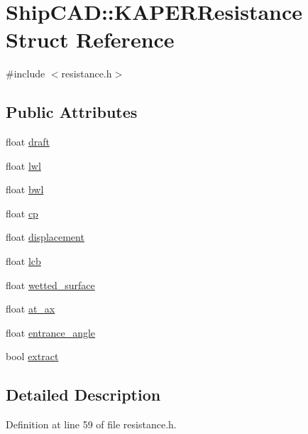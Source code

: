 \hypertarget{structShipCAD_1_1KAPERResistance}{\section{Ship\-C\-A\-D\-:\-:K\-A\-P\-E\-R\-Resistance Struct Reference}
\label{structShipCAD_1_1KAPERResistance}
}


{\ttfamily \#include $<$resistance.\-h$>$}

\subsection*{Public Attributes}
\begin{DoxyCompactItemize}
\item 
float \hyperlink{structShipCAD_1_1KAPERResistance_a0be8d3ba3d4e485abe71c462575b478a}{draft}
\item 
float \hyperlink{structShipCAD_1_1KAPERResistance_a1c2aa0aa33bf7770cd531f1d1ea8b809}{lwl}
\item 
float \hyperlink{structShipCAD_1_1KAPERResistance_ab1cc995ebce998cfc19ef8b1501f328e}{bwl}
\item 
float \hyperlink{structShipCAD_1_1KAPERResistance_a07797d6eb31e9a5506f7fca4b92d3f3a}{cp}
\item 
float \hyperlink{structShipCAD_1_1KAPERResistance_a5227818b90eab4991e339bbdf2e382ca}{displacement}
\item 
float \hyperlink{structShipCAD_1_1KAPERResistance_a3b351285dc50665147ce987e0744b314}{lcb}
\item 
float \hyperlink{structShipCAD_1_1KAPERResistance_a912090d77ad755a5b1506372c24540bc}{wetted\-\_\-surface}
\item 
float \hyperlink{structShipCAD_1_1KAPERResistance_a803e780e97a79538c29af4a28c0afd51}{at\-\_\-ax}
\item 
float \hyperlink{structShipCAD_1_1KAPERResistance_a941bc6efce4bc30f542cae5c68218aee}{entrance\-\_\-angle}
\item 
bool \hyperlink{structShipCAD_1_1KAPERResistance_a61ce222b79ad3964b278f5239dd2618f}{extract}
\end{DoxyCompactItemize}


\subsection{Detailed Description}


Definition at line 59 of file resistance.\-h.



